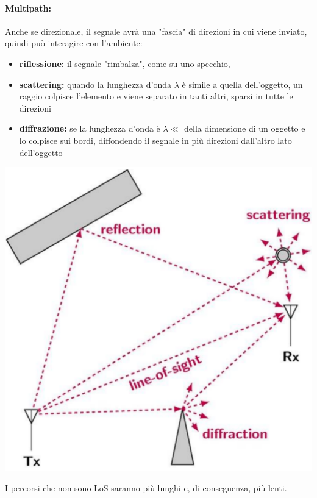 \paragraph{Multipath:} Anche se direzionale, il segnale avrà una "fascia" di direzioni in cui viene inviato, quindi può interagire con l'ambiente: 
\begin{itemize}
	\item \textbf{riflessione:} il segnale "rimbalza", come su uno specchio, 
	
    \item \textbf{scattering:} quando la lunghezza d'onda $\lambda$ è simile a quella dell'oggetto, un raggio colpisce l'elemento e viene separato in tanti altri, sparsi in tutte le direzioni 
	
    \item \textbf{diffrazione:} se la lunghezza d'onda è $\lambda \ll$ della dimensione di un oggetto e lo colpisce sui bordi, diffondendo il segnale in più direzioni dall'altro lato dell'oggetto
\end{itemize}
\begin{center}
	\includegraphics[width=0.5\linewidth]{img/wireless/multipath1}
\end{center}

I percorsi che non sono LoS saranno più lunghi e, di conseguenza, più lenti.  

